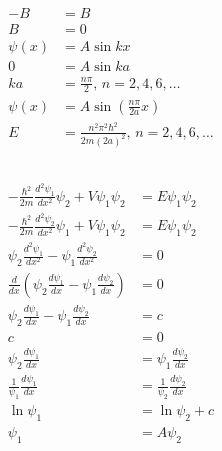 \documentclass{article}
\begin{document}
\begin{align*}
  -B                                       & = B                                                                  \\
  B                                        & = 0                                                                  \\
  \psi(x)                                  & = A \sin k x                                                         \\
  0                                        & = A \sin k a                                                         \\
  k a                                      & = \frac{n \pi}{2}, \,n = 2, 4, 6, \ldots                             \\
  \psi(x)                                  & = A \sin \left( \frac{n \pi}{2 a} x \right)                          \\
  E                                        & = \frac{n^2 \pi^2 \hbar^2}{2 m (2 a)^2}, \,n = 2, 4, 6, \ldots
\end{align*}

\subsection{}

\begin{align*}
  -\frac{\hbar^2}{2 m} \frac{d^2 \psi_1}{d x^2} \psi_2 + V \psi_1 \psi_2                 & = E \psi_1 \psi_2                       \\
  -\frac{\hbar^2}{2 m} \frac{d^2 \psi_2}{d x^2} \psi_1 + V \psi_1 \psi_2                 & = E \psi_1 \psi_2                       \\
  \psi_2 \frac{d^2 \psi_1}{d x^2} - \psi_1 \frac{d^2 \psi_2}{d x^2}                      & = 0                                     \\
  \frac{d}{d x} \left( \psi_2 \frac{d \psi_1}{d x} - \psi_1 \frac{d \psi_2}{d x} \right) & = 0                                     \\
  \psi_2 \frac{d \psi_1}{d x} - \psi_1 \frac{d \psi_2}{d x}                              & = c                                     \\
  c                                                                                      & = 0                                     \\
  \psi_2 \frac{d \psi_1}{d x}                                                            & = \psi_1 \frac{d \psi_2}{d x}           \\
  \frac{1}{\psi_1} \frac{d \psi_1}{d x}                                                  & = \frac{1}{\psi_2} \frac{d \psi_2}{d x} \\
  \ln \psi_1                                                                             & = \ln \psi_2 + c                        \\
  \psi_1                                                                                 & = A \psi_2
\end{align*}
\end{document}
